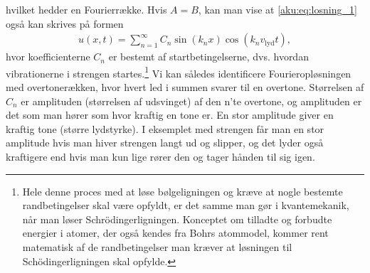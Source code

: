 %
hvilket hedder en Fourierrække. Hvis $A=B$, kan man vise at \cref{aku:eq:losning_1} også kan skrives på formen
%
\begin{align} \label{aku:eq:losning_2}
    u(x,t) = \sum_{n=1}^\infty C_n\sin(k_nx)\cos(k_nv_\mathrm{lyd}t),
\end{align}
%
hvor koefficienterne $C_n$ er bestemt af startbetingelserne, dvs. hvordan vibrationerne i strengen startes.\footnote{Hele denne proces med at løse bølgeligningen og kræve at nogle bestemte randbetingelser skal være opfyldt, er det samme man gør i kvantemekanik, når man løser Schrödingerligningen. Konceptet om tilladte og forbudte energier i atomer, der også kendes fra Bohrs atommodel, kommer rent matematisk af de randbetingelser man kræver at løsningen til Schödingerligningen skal opfylde.} 
Vi kan således identificere Fourieropløsningen med overtonerækken, hvor hvert led i summen svarer til en overtone. Størrelsen af $C_n$ er amplituden (størrelsen af udsvinget) af den n'te overtone, og amplituden er det som man hører som hvor kraftig en tone er. En stor amplitude giver en kraftig tone (større lydstyrke). I eksemplet med strengen får man en stor amplitude hvis man hiver strengen langt ud og slipper, og det lyder også kraftigere end hvis man kun lige rører den og tager hånden til sig igen.